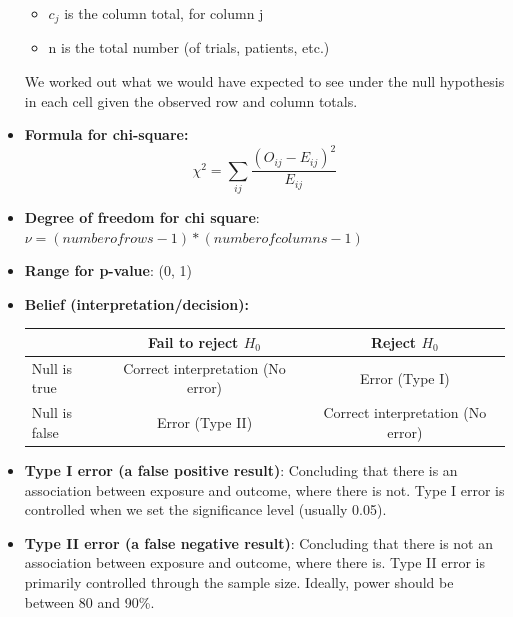 \documentclass[12pt]{book}
\begin{document}
\begin{itemize}
\begin{itemize}
\item $c_j$ is the column total, for column j 
\item n is the total number (of trials, patients, etc.)
\end{itemize}
We worked out what we would have expected to see under the null hypothesis in each cell given the observed row and column totals.
\item \textbf{Formula for chi-square:}
$$\chi^2=\sum_{ij}\frac{(O_{ij}-E_{ij})^2}{E_{ij}}$$
\item \textbf{Degree of freedom for chi square}: $\nu = (number of rows - 1) * (number of columns - 1)$
\item \textbf{Range for p-value}: (0, 1)
\item \textbf{Belief (interpretation/decision):}
\begin{table}[h!]
\centering
\begin{tabular}{|l|c|c|}
\hline
& Fail to reject $H_0$ & Reject $H_0$ \\ \hline
Null is true & Correct interpretation (No error) & Error (Type I) \\ \hline
Null is false & Error (Type II) & Correct interpretation (No error) \\
\hline
\end{tabular}
\end{table}
\item \textbf{Type I error (a false positive result)}: Concluding that there is an association between exposure and outcome, where there is not. Type I error is controlled when we set the significance level (usually 0.05).
\item \textbf{Type II error (a false negative result)}: Concluding that there is not an association between exposure and outcome, where there is. Type II error is primarily controlled through the sample size. Ideally, power should be between 80 and 90\%.
\end{itemize}

\graphicspath{{./}}


\newpage

\pagestyle{fancy}
\end{document}
